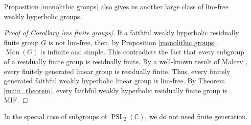 \documentclass[11pt,letterpaper]{article}
\newcommand{\CC}{\mathbb{C}}
\DeclareMathOperator{\Mon}{Mon}
\DeclareMathOperator{\PSL}{PSL}
\theoremstyle{definition}
\theoremstyle{remark}
\begin{document}
Proposition \ref{monolithic groups} also gives us another large class of lim-free weakly hyperbolic groups.

\begin{proof}[Proof of Corollary \ref{res finite groups}]
If a faithful weakly hyperbolic residually finite group $G$ is not lim-free, then, by Proposition \ref{monolithic groups}, $\Mon(G)$ is infinite and simple. This contradicts the fact that every subgroup of a residually finite group is residually finite. By a well-known result of Malcev \cite{Mal}, every finitely generated linear group is residually finite. Thus, every finitely generated faithful weakly hyperbolic linear group is lim-free. By Theorem \ref{main_theorem}, every faithful weakly hyperbolic residually finite group is MIF. 
\end{proof}


In the special case of subgroups of  $\PSL_2(\CC)$, we do not need finite generation.
\end{document}
